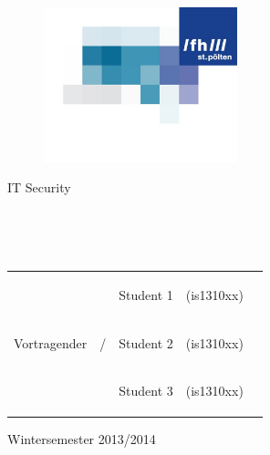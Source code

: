 \documentclass{scrartcl}
\title{\fhtitel}
\subtitle{\fhStudienbeschreibung}
\author{\fhautoren}
\date{\today}
\newcommand{\fhUeNummer}{1}
\newcommand{\fhBeschreibung}{Uebungstitel}
\newcommand{\fhStudiengang}{BIS-VZ}
\newcommand{\fhFach}{ENVS}
\newcommand{\fhVortragender}{\begin{Large}Vortragender\end{Large}}
\newcommand{\fhTitel}{UE~\fhUeNummer~-~\fhBeschreibung}
\newcommand{\fhUntertitel}{\fhFach~\fhStudiengang}
\begin{document}
\begin{titlepage}
\vspace*{-1.5cm}
\begin{figure}[h]
    \hspace{9.1cm}
    \includegraphics[width=0.5\textwidth]{fh_logo}   
\end{figure}
\vspace*{-1.5cm}
\vspace{-4.2cm}
\begin{huge}{\color{fhColor} IT Security}\end{huge}
\vspace{6cm}
\begin{flushright}
    \textbf{\Huge \color{fhColor}{\fhTitel}}\\
    
    \vspace{0.5cm}
    
    \begin{huge} \color{fhColor}{\fhUntertitel}\end{huge}\\
    
    \vspace{2cm}
\end{flushright}
\begin{flushright}
    \renewcommand{\arraystretch}{1.25}
    \begin{tabular}{lllll}
    \multirow{3}{*}{\fhVortragender} & \multirow{3}{*}{\begin{Large}/\end{Large}} & \begin{LARGE}Student 1\end{LARGE} & \small{(is1310xx)}\\
    && \begin{LARGE}Student 2\end{LARGE} & \small{(is1310xx)}\\
    && \begin{LARGE}Student 3\end{LARGE} & \small{(is1310xx)}
    \end{tabular}
    \vspace{2cm}
\renewcommand{\arraystretch}{1.0}
\end{flushright}
\begin{flushright}
    \begin{Large} Wintersemester 2013/2014\end{Large}
    

\end{flushright}
\end{titlepage}
\end{document}
